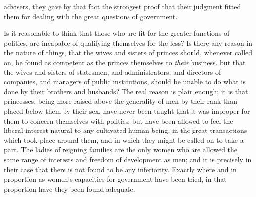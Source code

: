 \documentclass[12pt]{report}
\begin{document}
advisers, they gave by that fact the strongest proof that their judgment fitted them for dealing with the great questions of government.

Is it reasonable to think that those who are fit for the greater functions of politics, are incapable of qualifying themselves for the less? Is there any reason in the nature of things, that the wives and sisters of princes should, whenever called on, be found as competent as the princes themselves to \emph{their} business, but that the wives and sisters of statesmen, and administrators, and directors of companies, and managers of public institutions, should be unable to do what is done by their brothers and husbands? The real reason is plain enough; it is that princesses, being more raised above the generality of men by their rank than placed below them by their sex, have never been taught that it was improper for them to concern themselves with politics; but have been allowed to feel the liberal interest natural to any cultivated human being, in the great transactions which took place around them, and in which they might be called on to take a part. The ladies of reigning families are the only women who are allowed the same range of interests and freedom of development as men; and it is precisely in their case that there is not found to be any inferiority. Exactly where and in proportion as women's capacities for government have been tried, in that proportion have they been found adequate.
\end{document}
